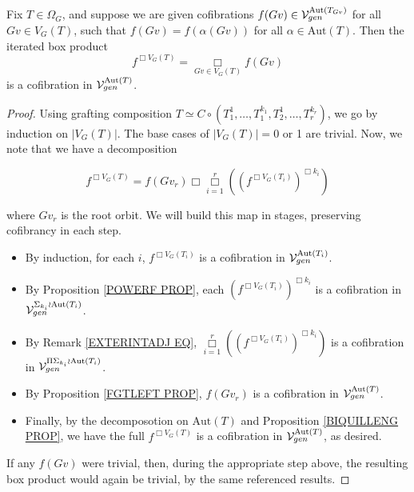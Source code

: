 \documentclass[a4paper,10pt]{article}%
\begin{document}
\begin{proposition}\label{GENUINE_TREE_BOX_COFIBRANT_PROP} 
 Fix $T\in \Omega_G$, and suppose we are given cofibrations $f(Gv) \in \mathcal V^{\mathrm{Aut}(T_{Gv})}_{gen}$ for all $Gv\in V_G(T)$, such that $f(Gv) = f(\alpha(Gv))$ for all $\alpha\in \mathrm{Aut}(T)$. Then the iterated box product 
\[ 
f^{\Box V_G(T)} = \mathop{\Box}\limits_{Gv \in V_G(T)} f(Gv) 
\] 
is a cofibration in $\mathcal V^{\mathrm{Aut}(T)}_{gen}$.  
\end{proposition} 
\begin{proof} 
  Using grafting composition $T \simeq C \circ (T^1_1, \ldots, T^{k_1}_1, T^1_2, \ldots, T^{k_r}_r)$, we go by induction on $|V_G(T)|$. The base cases of $|V_G(T)| = 0$ or 1 are trivial. Now, we note that we have a decomposition 

\[ 
f^{\Box V_G(T)} = f(Gv_r) \Box \mathop{\Box}\limits_{i=1}^r\left( \left( f^{\Box V_G(T_i)} \right) ^{\Box k_i} \right) 
\] 

where $Gv_r$ is the root orbit. We will build this map in stages, preserving cofibrancy in each step. 

\begin{itemize} 
\item By induction, for each $i$, $f^{\Box V_G(T_i)}$ is a cofibration in $\mathcal V^{\mathrm{Aut}(T_i)}_{gen}$. 
\item By Proposition \ref{POWERF PROP}, each $\left( f^{\Box V_G(T_i)} \right)^{\Box k_i}$ is a cofibration in $\mathcal V^{\Sigma_{k_i}\wr \mathrm{Aut}(T_i)}_{gen}$. 
\item By Remark \ref{EXTERINTADJ EQ}, $\mathop{\Box}\limits_{i=1}^r\left(\left( f^{\Box V_G(T_i)} \right)^{\Box k_i}\right)$ is a cofibration in $\mathcal V^{\Pi \Sigma_{k_i} \wr \mathrm{Aut}(T_i)}_{gen}$. 
\item By Proposition \ref{FGTLEFT PROP}, $f(Gv_r)$ is a cofibration in $\mathcal V^{\mathrm{Aut}(T)}_{gen}$. 
\item Finally, by the decomposotion on $\mathrm{Aut}(T)$ and Proposition \ref{BIQUILLENG PROP}, we have the full $f^{\Box V_G(T)}$ is a cofibration in $\mathcal V^{\mathrm{Aut}(T)}_{gen}$, as desired. 
\end{itemize} 

If any $f(Gv)$ were trivial, then, during the appropriate step above, the resulting box product would again be trivial, by the same referenced results. 
\end{proof} 
\end{document}

